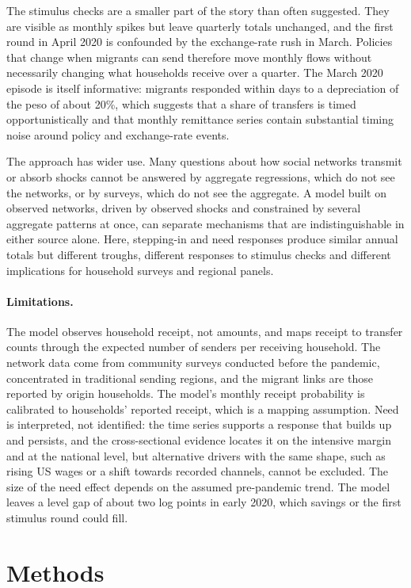 \documentclass[11pt]{article}
\begin{document}
The stimulus checks are a smaller part of the story than often suggested. They are visible as monthly spikes but leave quarterly totals unchanged, and the first round in April 2020 is confounded by the exchange-rate rush in March. Policies that change when migrants can send therefore move monthly flows without necessarily changing what households receive over a quarter. The March 2020 episode is itself informative: migrants responded within days to a depreciation of the peso of about 20\%, which suggests that a share of transfers is timed opportunistically and that monthly remittance series contain substantial timing noise around policy and exchange-rate events.

The approach has wider use. Many questions about how social networks transmit or absorb shocks cannot be answered by aggregate regressions, which do not see the networks, or by surveys, which do not see the aggregate. A model built on observed networks, driven by observed shocks and constrained by several aggregate patterns at once, can separate mechanisms that are indistinguishable in either source alone. Here, stepping-in and need responses produce similar annual totals but different troughs, different responses to stimulus checks and different implications for household surveys and regional panels.

\paragraph{Limitations.} The model observes household receipt, not amounts, and maps receipt to transfer counts through the expected number of senders per receiving household. The network data come from community surveys conducted before the pandemic, concentrated in traditional sending regions, and the migrant links are those reported by origin households. The model's monthly receipt probability is calibrated to households' reported receipt, which is a mapping assumption. Need is interpreted, not identified: the time series supports a response that builds up and persists, and the cross-sectional evidence locates it on the intensive margin and at the national level, but alternative drivers with the same shape, such as rising US wages or a shift towards recorded channels, cannot be excluded. The size of the need effect depends on the assumed pre-pandemic trend. The model leaves a level gap of about two log points in early 2020, which savings or the first stimulus round could fill.

\section{Methods}
\end{document}
